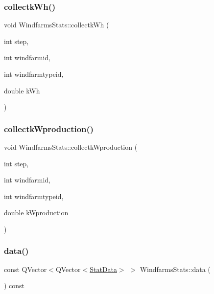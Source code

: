 \subsubsection{\texorpdfstring{collectkWh()}{collectkWh()}}
{\footnotesize\ttfamily void Windfarms\+Stats\+::collectk\+Wh (\begin{DoxyParamCaption}\item[{int}]{step,  }\item[{int}]{windfarmid,  }\item[{int}]{windfarmtypeid,  }\item[{double}]{k\+Wh }\end{DoxyParamCaption})}

\mbox{\label{class_windfarms_stats_add9ccf600833d4d2ac52f9ec4bb62ed1}} 
\subsubsection{\texorpdfstring{collectkWproduction()}{collectkWproduction()}}
{\footnotesize\ttfamily void Windfarms\+Stats\+::collectk\+Wproduction (\begin{DoxyParamCaption}\item[{int}]{step,  }\item[{int}]{windfarmid,  }\item[{int}]{windfarmtypeid,  }\item[{double}]{k\+Wproduction }\end{DoxyParamCaption})}

\mbox{\label{class_windfarms_stats_aa8c4942f672303d9c3e46723c6d4d9da}} 
\subsubsection{\texorpdfstring{data()}{data()}}
{\footnotesize\ttfamily const Q\+Vector$<$Q\+Vector$<$\mbox{\hyperlink{struct_windfarms_stats_1_1_stat_data}{Stat\+Data}}$>$ $>$ Windfarms\+Stats\+::data (\begin{DoxyParamCaption}{ }\end{DoxyParamCaption}) const\hspace{0.3cm}{\ttfamily [inline]}}

